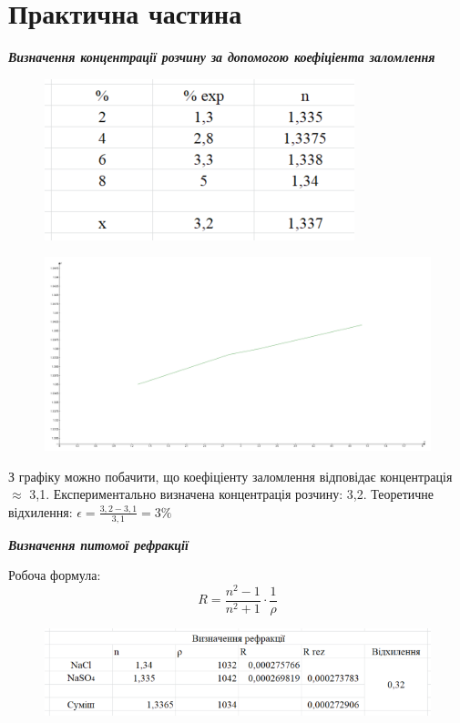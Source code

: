 \section{Практична частина}
\setlength{\parindent}{4em}
\begin{center}
  {\textbf{\emph{Визначення концентрації розчину за допомогою коефіціента заломлення}}}
\end{center}
\begin{figure}[ht]

\centering

\includegraphics[width=0.55\linewidth]{Pics/table1.png}

\label{table1}

\end{figure}
\begin{figure}[ht]

\centering

\includegraphics[width=0.7\linewidth]{Pics/Plot1.png}

\label{table1}

\end{figure}
\qquad З графіку можно побачити, що коефіціенту заломлення відповідає концентрація $\approx$ 3,1. Експериментально визначена концентрація розчину: 3,2. Теоретичне відхилення: $\epsilon = \frac{3,2-3,1}{3,1} = 3\%$
\begin{center}
  {\textbf{\emph{Визначення питомої рефракції }}}
\end{center}
Робоча формула:
$$R = \frac{n^2 -1}{n^2 + 1} \cdot \frac{1}{\rho}$$
\begin{figure}[ht]

\centering

\includegraphics[width=1\linewidth]{Pics/table2.png}


\label{Prac2}

\end{figure}
